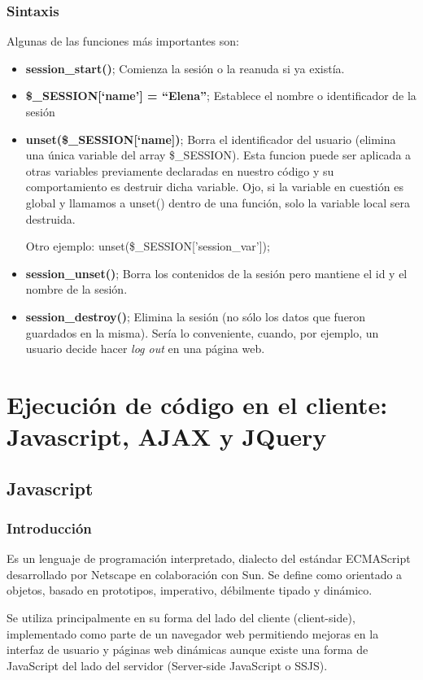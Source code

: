 \documentclass{apuntes}
\begin{document}
\subsubsection{Sintaxis}
Algunas de las funciones más importantes son:
\begin{itemize}
\item \textbf{session\_start()}; Comienza la sesión o la reanuda si ya existía.
\item \textbf{\$\_SESSION[‘name’] = “Elena”}; Establece el nombre o identificador  de la sesión
\item \textbf{unset(\$\_SESSION[‘name])}; Borra el identificador del usuario (elimina una única variable del array \$\_SESSION). Esta funcion puede ser aplicada a otras variables previamente declaradas en nuestro código y su comportamiento es destruir dicha variable. Ojo, si la variable en cuestión es global y llamamos a unset() dentro de una función, solo la variable local sera destruida.

 Otro ejemplo:
unset(\$\_SESSION['session\_var']);

\item \textbf{session\_unset()}; Borra los contenidos de la sesión pero mantiene el id y el nombre de la sesión.
\item \textbf{session\_destroy()}; Elimina la sesión (no sólo los datos que fueron guardados en la misma). Sería lo conveniente, cuando, por ejemplo, un usuario decide hacer \emph{log out} en una página web.
\end{itemize}

\section{Ejecución de código en el cliente: Javascript, AJAX y JQuery}

\subsection{Javascript}
\subsubsection{Introducción}
Es un lenguaje de programación interpretado, dialecto del estándar ECMAScript desarrollado por Netscape en colaboración con Sun. Se define como orientado a objetos, basado en prototipos, imperativo, débilmente tipado y dinámico.

Se utiliza principalmente en su forma del lado del cliente (client-side), implementado como parte de un navegador web permitiendo mejoras en la interfaz de usuario y páginas web dinámicas aunque existe una forma de JavaScript del lado del servidor (Server-side JavaScript o SSJS). 
\end{document}
